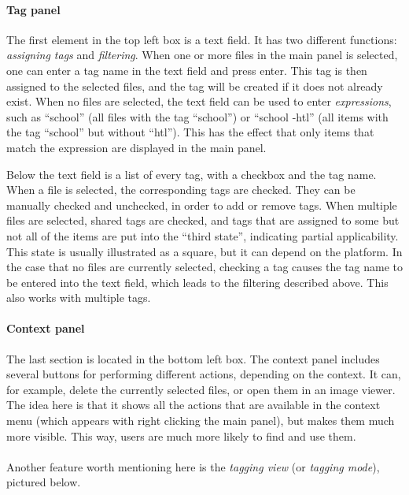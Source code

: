 \paragraph{Tag panel} The first element in the top left box is a text field. It
has two different functions: \emph{assigning tags} and \emph{filtering}.  When
one or more files in the main panel is selected, one can enter a tag name in
the text field and press enter. This tag is then assigned to the selected
files, and the tag will be created if it does not already exist. When no files
are selected, the text field can be used to enter \emph{expressions}, such as
``school'' (all files with the tag ``school'') or ``school -htl'' (all items
with the tag ``school'' but without ``htl''). This has the effect that only
items that match the expression are displayed in the main panel.

Below the text field is a list of every tag, with a checkbox and the tag name.
When a file is selected, the corresponding tags are checked. They can be
manually checked and unchecked, in order to add or remove tags. When multiple
files are selected, shared tags are checked, and tags that are assigned to some
but not all of the items are put into the ``third state'', indicating partial
applicability. This state is usually illustrated as a square, but it can depend
on the platform. In the case that no files are currently selected, checking a
tag causes the tag name to be entered into the text field, which leads to the
filtering described above. This also works with multiple tags.

\paragraph{Context panel} The last section is located in the bottom left box.
The context panel includes several buttons for performing different actions,
depending on the context. It can, for example, delete the currently selected
files, or open them in an image viewer. The idea here is that it shows all the
actions that are available in the context menu (which appears with right
clicking the main panel), but makes them much more visible. This way, users are
much more likely to find and use them.

\paragraph{}
Another feature worth mentioning here is the \emph{tagging view} (or
\emph{tagging mode}), pictured below. %

